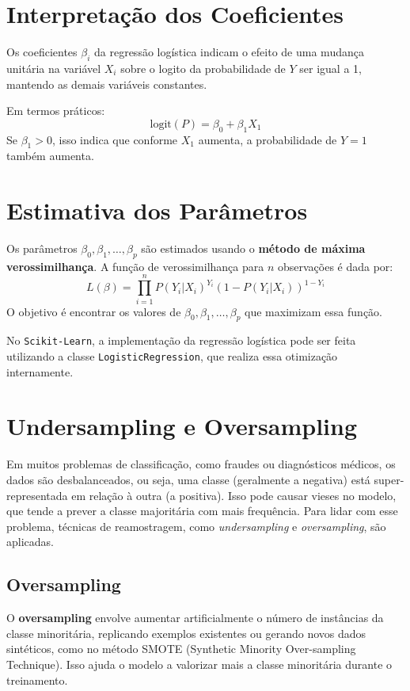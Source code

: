 \documentclass{abntpuc}
\begin{document}
\section{Interpretação dos Coeficientes}

Os coeficientes \(\beta_i\) da regressão logística indicam o efeito de uma mudança unitária na variável \(X_i\) sobre o logito da probabilidade de \(Y\) ser igual a 1, mantendo as demais variáveis constantes.

Em termos práticos:
\[
\text{logit}(P) = \beta_0 + \beta_1 X_1
\]
Se \(\beta_1 > 0\), isso indica que conforme \(X_1\) aumenta, a probabilidade de \(Y = 1\) também aumenta.

\section{Estimativa dos Parâmetros}

Os parâmetros \(\beta_0, \beta_1, \ldots, \beta_p\) são estimados usando o \textbf{método de máxima verossimilhança}. A função de verossimilhança para \(n\) observações é dada por:
\[
L(\beta) = \prod_{i=1}^n P(Y_i|X_i)^{Y_i} (1 - P(Y_i|X_i))^{1 - Y_i}
\]
O objetivo é encontrar os valores de \(\beta_0, \beta_1, \ldots, \beta_p\) que maximizam essa função.

No \texttt{Scikit-Learn}, a implementação da regressão logística pode ser feita utilizando a classe \texttt{LogisticRegression}, que realiza essa otimização internamente.

\section{Undersampling e Oversampling}

Em muitos problemas de classificação, como fraudes ou diagnósticos médicos, os dados são desbalanceados, ou seja, uma classe (geralmente a negativa) está super-representada em relação à outra (a positiva). Isso pode causar vieses no modelo, que tende a prever a classe majoritária com mais frequência. Para lidar com esse problema, técnicas de reamostragem, como \textit{undersampling} e \textit{oversampling}, são aplicadas.

\subsection{Oversampling}

O \textbf{oversampling} envolve aumentar artificialmente o número de instâncias da classe minoritária, replicando exemplos existentes ou gerando novos dados sintéticos, como no método SMOTE (Synthetic Minority Over-sampling Technique). Isso ajuda o modelo a valorizar mais a classe minoritária durante o treinamento.
\end{document}
